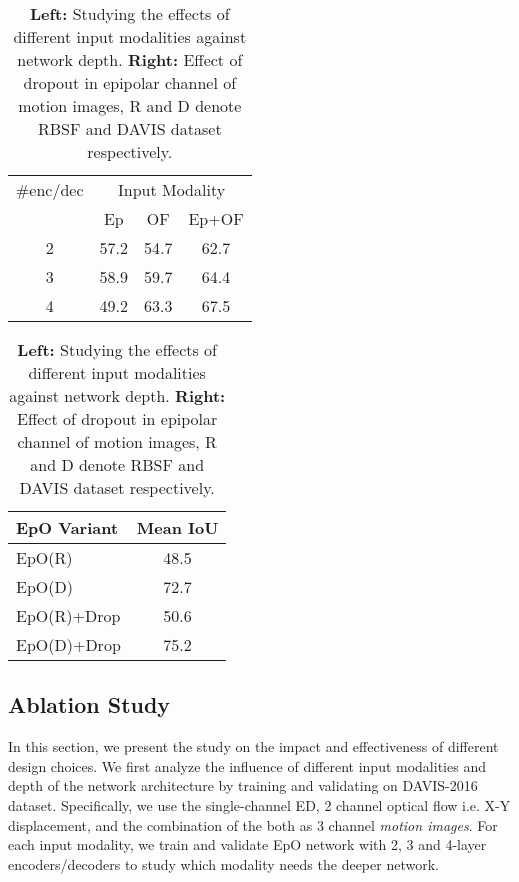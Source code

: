 \documentclass[10pt,twocolumn,letterpaper]{article}
\newcommand{\rowSpace}{\vspace{-0.4cm}}
\begin{document}
\setlength{\tabcolsep}{1.4pt}
\begin{table}
\begin{center}
\centering
\begin{tabular}{c|ccc}
    \hline
    \hline
    {\#enc/dec} & \multicolumn{3}{c}{Input Modality} \\
     & Ep & OF & Ep+OF \\
    \hline
    2 & 57.2 & 54.7 & 62.7 \\
3 & 58.9 & 59.7 & 64.4 \\
4 & 49.2 & 63.3 & 67.5 \\
    \hline
\end{tabular}
\quad
\begin{tabular}{l|c}
    \hline
    \hline
    EpO Variant & Mean IoU \\
    \hline
    EpO{\scriptsize{(R)}} & 48.5 \\
    EpO{\scriptsize{(D)}} & 72.7 \\
    EpO{\scriptsize{(R)}}+Drop & 50.6 \\
    EpO{\scriptsize{(D)}}+Drop & 75.2 \\
    \hline
\end{tabular}
\end{center}
\vspace{-0.2in}
\caption{\textbf{Left:} Studying the effects of different input modalities against network depth. \textbf{Right:} Effect of dropout in epipolar channel of motion images, R and D denote RBSF and DAVIS dataset respectively. \label{tab:ablation}} \rowSpace 
\end{table}
\subsection{Ablation Study}
In this section, we present the study on the impact and effectiveness of different design choices. We first analyze the influence of different input modalities and depth of the network architecture by training and validating on DAVIS-2016 dataset. Specifically, we use the single-channel ED, 2 channel optical flow i.e. X-Y displacement, and the combination of the both as 3 channel \textit{motion images}. For each input modality, we train and validate EpO network with 2, 3 and 4-layer encoders/decoders to study which modality needs the deeper network.
\end{document}
